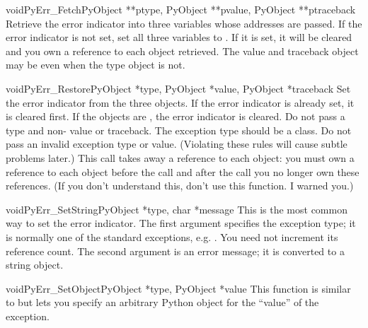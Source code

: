 \begin{cfuncdesc}{void}{PyErr_Fetch}{PyObject **ptype, PyObject **pvalue,
                                     PyObject **ptraceback}
  Retrieve the error indicator into three variables whose addresses
  are passed.  If the error indicator is not set, set all three
  variables to \NULL.  If it is set, it will be cleared and you own a
  reference to each object retrieved.  The value and traceback object
  may be \NULL{} even when the type object is not.  
\end{cfuncdesc}

\begin{cfuncdesc}{void}{PyErr_Restore}{PyObject *type, PyObject *value,
                                       PyObject *traceback}
  Set  the error indicator from the three objects.  If the error
  indicator is already set, it is cleared first.  If the objects are
  \NULL, the error indicator is cleared.  Do not pass a \NULL{} type
  and non-\NULL{} value or traceback.  The exception type should be a
  class.  Do not pass an invalid exception type or value.
  (Violating these rules will cause subtle problems later.)  This call
  takes away a reference to each object: you must own a reference to
  each object before the call and after the call you no longer own
  these references.  (If you don't understand this, don't use this
  function.  I warned you.)  
\end{cfuncdesc}

\begin{cfuncdesc}{void}{PyErr_SetString}{PyObject *type, char *message}
  This is the most common way to set the error indicator.  The first
  argument specifies the exception type; it is normally one of the
  standard exceptions, e.g. .  You need not
  increment its reference count.  The second argument is an error
  message; it is converted to a string object.
\end{cfuncdesc}

\begin{cfuncdesc}{void}{PyErr_SetObject}{PyObject *type, PyObject *value}
  This function is similar to  but lets
  you specify an arbitrary Python object for the ``value'' of the
  exception.
\end{cfuncdesc}

